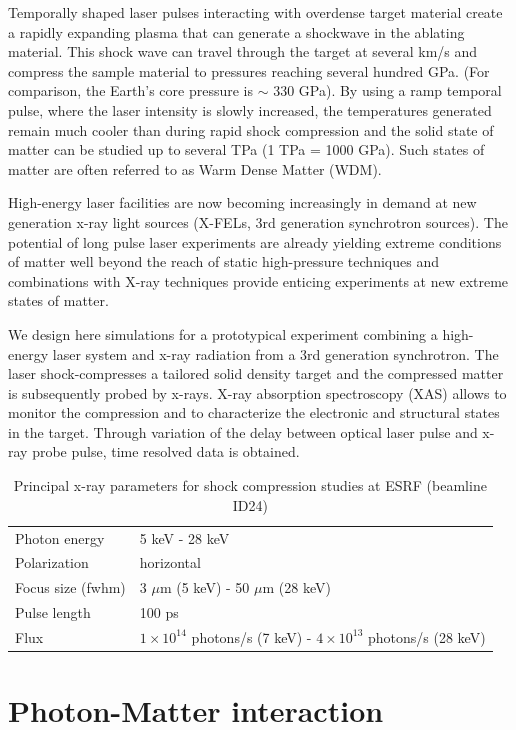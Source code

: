 \documentclass[12pt]{scrartcl}
\begin{document}
Temporally shaped laser pulses interacting with overdense target material create a rapidly expanding plasma that can generate a shockwave in
the ablating material. This shock wave can travel through the target at several km/s and compress the sample material to pressures reaching
several hundred GPa. (For comparison, the Earth's core pressure is $\sim$ 330 GPa). By using a ramp temporal pulse, where the laser intensity
is slowly increased, the temperatures generated remain much cooler than during rapid shock compression and the solid state of matter can be
studied up to several TPa (1 TPa = 1000 GPa). Such states of matter are often referred to as Warm Dense Matter (WDM).

High-energy laser facilities are now becoming increasingly in demand at new generation x-ray light sources (X-FELs, 3rd generation synchrotron
sources). The potential of long pulse laser experiments are already yielding extreme conditions of matter well beyond the reach of static
high-pressure techniques and combinations with X-ray techniques provide enticing experiments at new extreme states of matter.

We design here simulations for a prototypical experiment combining a high-energy laser system and x-ray radiation from a 3rd generation
synchrotron. The laser shock-compresses a tailored solid density target and the compressed matter is subsequently probed by x-rays. X-ray
absorption spectroscopy (XAS) allows to monitor the compression and to characterize the electronic and structural states in the target. Through
variation of the delay between optical laser pulse and x-ray probe pulse, time resolved data is obtained.

\begin{table}[h]
  \centering
  \begin{tabular}{l|l}
    \hline
    \hline
    Photon energy & 5 keV - 28 keV \\
    Polarization & horizontal \\
    Focus size (fwhm) & 3 $\mu$m (5 keV) - 50 $\mu$m (28 keV)\\
    Pulse length & 100 ps\\
    Flux  & $1\times 10^{14}$ photons/s (7 keV) - $4\times 10^{13}$ photons/s (28 keV) \\
    \hline
    \hline
  \end{tabular}
  \caption{Principal x-ray parameters for shock compression studies at ESRF
  (beamline ID24)}
  \label{tab:esrf_parameters}
\end{table}
\section{Photon-Matter interaction}
\end{document}
